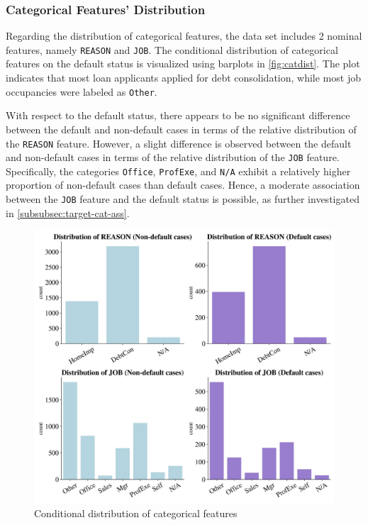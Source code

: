 \subsubsection{Categorical Features' Distribution}
\label{subsubsec:catdist}

Regarding the distribution of categorical features, the data set includes 2 nominal features, namely \texttt{REASON} and \texttt{JOB}.
The conditional distribution of categorical features on the default status is visualized using barplots in \autoref{fig:catdist}.
The plot indicates that most loan applicants applied for debt consolidation, while most job occupancies were labeled as \texttt{Other}.

With respect to the default status, there appears to be no significant difference between the default and non-default cases in terms of the relative distribution of the \texttt{REASON} feature.
However, a slight difference is observed between the default and non-default cases in terms of the relative distribution of the \texttt{JOB} feature.
Specifically, the categories \texttt{Office}, \texttt{ProfExe}, and \texttt{N/A} exhibit a relatively higher proportion of non-default cases than default cases.
Hence, a moderate association between the \texttt{JOB} feature and the default status is possible, as further investigated in \autoref{subsubsec:target-cat-ass}.


\begin{figure}[H]
\centering
\caption{Conditional distribution of categorical features}\vspace{0.5em}
\label{fig:catdist}
\includegraphics[width=140mm]{Figures/Categorical_Features_Distribution.jpg}
\vspace{-1em}
\end{figure}
